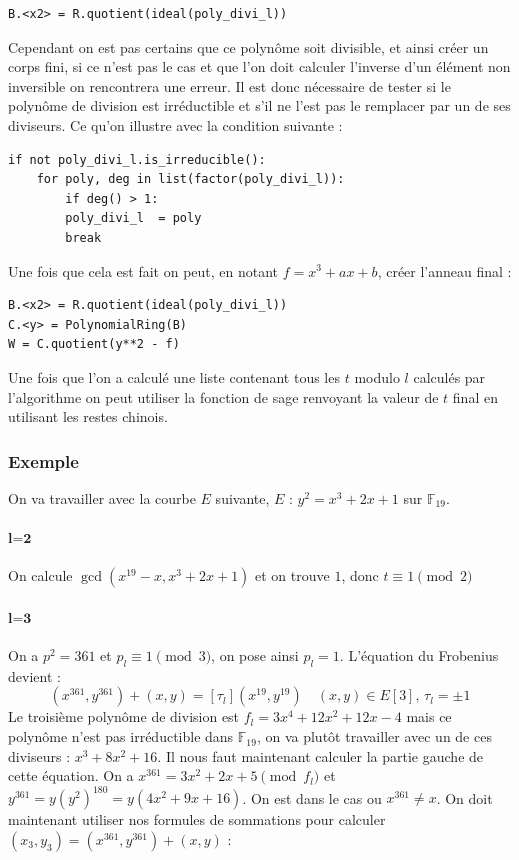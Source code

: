 \documentclass{article}
\begin{document}
\begin{lstlisting}
B.<x2> = R.quotient(ideal(poly_divi_l))
\end{lstlisting}
\bigskip
Cependant on est pas certains que ce polynôme soit divisible, et ainsi créer un corps fini, si ce n'est pas le cas et que l'on doit calculer l'inverse d'un élément non inversible on rencontrera une erreur. Il est donc nécessaire de tester si le polynôme de division est irréductible et s'il ne l'est pas le remplacer par un de ses diviseurs. Ce qu'on illustre avec la condition suivante :
\bigskip
\begin{lstlisting}
if not poly_divi_l.is_irreducible():      
	for poly, deg in list(factor(poly_divi_l)):
		if deg() > 1:
		poly_divi_l  = poly
		break
\end{lstlisting}
\bigskip
Une fois que cela est fait on peut, en notant $f=x^3 +ax+b$, créer l'anneau final :
\bigskip
\begin{lstlisting}
B.<x2> = R.quotient(ideal(poly_divi_l))
C.<y> = PolynomialRing(B)
W = C.quotient(y**2 - f)
\end{lstlisting}
\bigskip
Une fois que l'on a calculé une liste  contenant tous les $t$ modulo $l$ calculés par l'algorithme on peut utiliser la fonction de sage  renvoyant la valeur de $t$ final en utilisant les restes chinois.
\subsubsection{Exemple}
On va travailler avec la courbe $E$ suivante, $E$ : $y^2 =x^3 +2x+1$ sur $\mathbb{F}_{19}$.

\paragraph{$\textbf{l=2}$}
On calcule $\gcd(x^{19} -x, x^3 + 2x+1)$ et on trouve $1$, donc $t \equiv 1 \pmod 2$

\paragraph{$\textbf{l=3}$}
On a $p^2 = 361$ et $p_l \equiv 1 \pmod 3$, on pose ainsi $p_l = 1$. L'équation du Frobenius devient : 
\begin{equation}
(x^{361}, y^{361}) + (x,y) = [\tau_l](x^{19}, y^{19})  \quad (x,y) \in E[3], \, \tau_l = \pm 1
\end{equation}
Le troisième polynôme de division est $f_l = 3x^4 + 12x^2 +12x - 4$ mais ce polynôme n'est pas irréductible dans $\mathbb{F}_{19}$, on va plutôt travailler avec un de ces diviseurs : $x^3 + 8x^2+16$.
\newline 
Il nous faut maintenant calculer la partie gauche de cette équation.
On a $x^{361} = 3x^2 +2x +5 \pmod f_{l}$ et $y^{361} = y(y^2)^{180} = y(4x^2+9x+16)$. On est dans le cas ou $x^{361} \ne x$. On doit maintenant utiliser nos formules de sommations pour calculer $(x_3, y_3) =(x^{361}, y^{361}) + (x,y)$ : 
\end{document}
